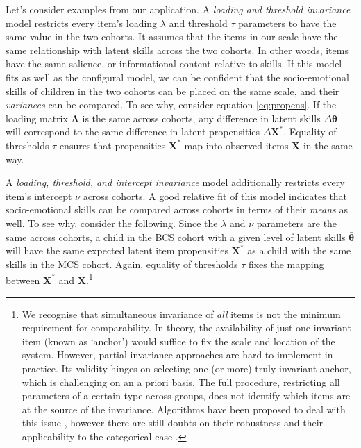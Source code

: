 Let's consider examples from our application. A \emph{loading and threshold invariance} model restricts every item's loading $\lambda$ and threshold $\tau$ parameters to have the same value in the two cohorts. It assumes that the items in our scale have the same relationship with latent skills across the two cohorts. In other words, items have the same salience, or informational content relative to skills. If this model fits as well as the configural model, we can be confident that the socio-emotional skills of children in the two cohorts can be placed on the same scale, and their \emph{variances} can be compared. To see why, consider equation \eqref{eq:propens}. If the loading matrix $\bm{\Lambda}$ is the same across cohorts, any difference in latent skills $\Delta\bm{\theta}$ will correspond to the same difference in latent propensities $\Delta\bm{X}^*$. Equality of thresholds $\tau$ ensures that propensities $\bm{X}^*$ map into observed items $\bm{X}$ in the same way.

A \emph{loading, threshold, and intercept invariance} model additionally restricts every item's intercept $\nu$ across cohorts. A good relative fit of this model indicates that socio-emotional skills can be compared across cohorts in terms of their \emph{means} as well. To see why, consider the following. Since the $\lambda$ and $\nu$ parameters are the same across cohorts, a child in the BCS cohort with a given level of latent skills $\bar{\bm{\theta}}$ will have the same expected latent item propensities $\bm{X}^*$ as a child with the same skills in the MCS cohort. Again, equality of thresholds $\tau$ fixes the mapping between $\bm{X}^*$ and $\bm{X}$.\footnote{We recognise that simultaneous invariance of \emph{all} items is not the minimum requirement for comparability. In theory, the availability of just one invariant item (known as `anchor') would suffice to fix the scale and location of the system. However, partial invariance approaches are hard to implement in practice. Its validity hinges on selecting one (or more) truly invariant anchor, which is challenging on an a priori basis. The full procedure, restricting all parameters of a certain type across groups, does not identify which items are at the source of the invariance. Algorithms have been proposed to deal with this issue \citep{Yoon2007,Cheung2012}, however there are still doubts on their robustness and their applicability to the categorical case \citep{Vandenberg2016}.}

